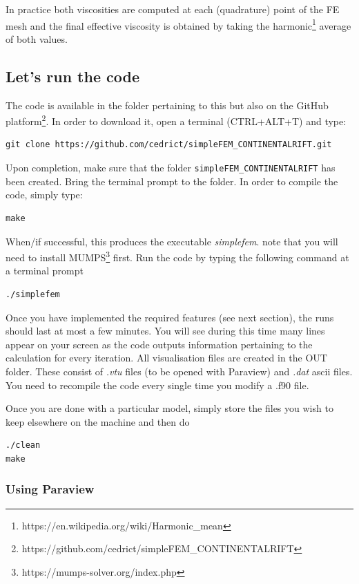 In practice both viscosities are computed at each (quadrature) point of the FE mesh and the final effective viscosity 
is obtained by taking the harmonic\footnote{https://en.wikipedia.org/wiki/Harmonic\_mean} average of both values.

\subsection*{Let's run the code}

The code is available in the folder pertaining to this \stone but also 
on the GitHub platform\footnote{https://github.com/cedrict/simpleFEM\_CONTINENTALRIFT}. 
In order to download it, open a terminal (CTRL+ALT+T) and type:
\begin{verbatim}
git clone https://github.com/cedrict/simpleFEM_CONTINENTALRIFT.git
\end{verbatim}
Upon completion, make sure that the folder {\tt simpleFEM\_CONTINENTALRIFT} has been created. Bring the 
terminal prompt to the folder.
In order to compile the code, simply type:
\begin{verbatim}
make
\end{verbatim}
When/if successful, this produces the executable {\sl simplefem}.
{\color{red} note that you will need to install MUMPS\footnote{https://mumps-solver.org/index.php} first.}
Run the code by typing the following command at a terminal prompt 
\begin{verbatim}
./simplefem
\end{verbatim}

Once you have implemented the required features (see next section), the runs should last at most a few minutes. 
You will see during this time many lines appear
on your screen as the code outputs information pertaining to the calculation for every iteration.
All visualisation files are created in the OUT folder. These consist of {\sl .vtu} files (to be opened with Paraview) and {\sl .dat} ascii files. 
You need to recompile the code every single time you modify a .f90 file.

Once you are done with a particular model, simply store the files you wish to keep elsewhere on the machine and then do
\begin{verbatim}
./clean
make
\end{verbatim}


\subsubsection*{Using Paraview}

